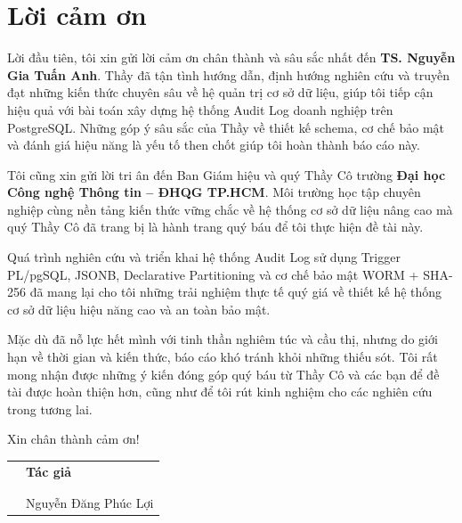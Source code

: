 \chapter*{Lời cảm ơn}

Lời đầu tiên, tôi xin gửi lời cảm ơn chân thành và sâu sắc nhất đến \textbf{TS. Nguyễn Gia Tuấn Anh}. Thầy đã tận tình hướng dẫn, định hướng nghiên cứu và truyền đạt những kiến thức chuyên sâu về hệ quản trị cơ sở dữ liệu, giúp tôi tiếp cận hiệu quả với bài toán xây dựng hệ thống Audit Log doanh nghiệp trên PostgreSQL. Những góp ý sâu sắc của Thầy về thiết kế schema, cơ chế bảo mật và đánh giá hiệu năng là yếu tố then chốt giúp tôi hoàn thành báo cáo này.

Tôi cũng xin gửi lời tri ân đến Ban Giám hiệu và quý Thầy Cô trường \textbf{Đại học Công nghệ Thông tin -- ĐHQG TP.HCM}. Môi trường học tập chuyên nghiệp cùng nền tảng kiến thức vững chắc về hệ thống cơ sở dữ liệu nâng cao mà quý Thầy Cô đã trang bị là hành trang quý báu để tôi thực hiện đề tài này.

Quá trình nghiên cứu và triển khai hệ thống Audit Log sử dụng Trigger PL/pgSQL, JSONB, Declarative Partitioning và cơ chế bảo mật WORM + SHA-256 đã mang lại cho tôi những trải nghiệm thực tế quý giá về thiết kế hệ thống cơ sở dữ liệu hiệu năng cao và an toàn bảo mật.

Mặc dù đã nỗ lực hết mình với tinh thần nghiêm túc và cầu thị, nhưng do giới hạn về thời gian và kiến thức, báo cáo khó tránh khỏi những thiếu sót. Tôi rất mong nhận được những ý kiến đóng góp quý báu từ Thầy Cô và các bạn để đề tài được hoàn thiện hơn, cũng như để tôi rút kinh nghiệm cho các nghiên cứu trong tương lai.

Xin chân thành cảm ơn!

\vspace{2cm}

{
\begin{center}
\centering
\begin{tabular}{>{\centering}m{}>{\centering\arraybackslash}m{}}
 & \textbf{Tác giả} \\
 & \\
 & \\
 & Nguyễn Đăng Phúc Lợi
\end{tabular}
\end{center}
}
